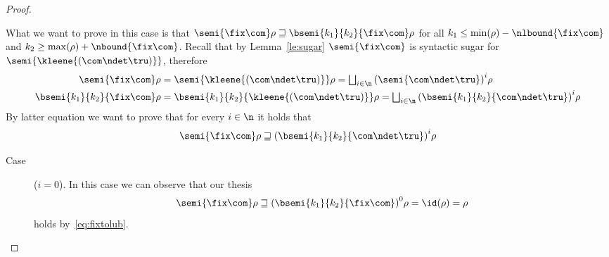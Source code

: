 \begin{proof}
\begin{inductive}
    \case{\(\fix{\com}\)} What we want to prove in this case is that
    \(\semi{\fix\com}\rho \sqsupseteq
    \bsemi{k_1}{k_2}{\fix\com}\rho\) for all
    \(k_1 \leq \min(\rho) - \nlbound{\fix\com}\) and
    \(k_2 \geq \max(\rho) + \nbound{\fix\com}\). Recall that by
    Lemma~\ref{le:sugar} \(\semi{\fix\com}\) is syntactic sugar
    for \(\semi{\kleene{(\com \ndet \tru)}}\), therefore
    \begin{align}
      \semi{\fix\com}\rho & =
      \semi{\kleene{(\com\ndet\tru)}}\rho =
      \textstyle\bigsqcup_{i\in\n}{\left(\semi{\com\ndet\tru}\right)}^i\rho \label{eq:fixtolub}\\
      \bsemi{k_1}{k_2}{\fix\com}\rho & =
      \bsemi{k_1}{k_2}{\kleene{(\com\ndet\tru)}}\rho =
      \textstyle\bigsqcup_{i\in\n}{\left(\bsemi{k_1}{k_2}{\com\ndet\tru}\right)}^i\rho \label{eq:fixtolubk}
    \end{align}
    By latter equation we want to prove that for every \(i\in\n\) it
    holds that
    \begin{equation}
      \semi{\fix\com}\rho \sqsupseteq {\left(\bsemi{k_1}{k_2}{\com\ndet\tru}\right)}^i\rho
    \end{equation}
    \begin{description}
    \item[Case] (\(i=0\)). In this case we can observe that our thesis
      \begin{equation*}
        \semi{\fix\com}\rho \sqsupseteq {\left(\bsemi{k_1}{k_2}{\fix\com}\right)}^0\rho = \id(\rho) = \rho
      \end{equation*}
      holds by~\eqref{eq:fixtolub}.
      

\end{description}
\end{inductive}
\end{proof}
